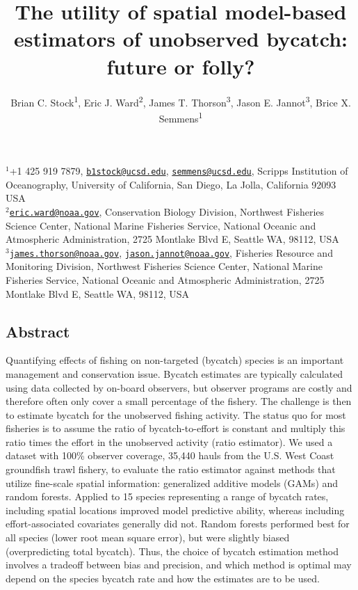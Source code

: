 \documentclass[]{article}
\title{The utility of spatial model-based estimators of unobserved bycatch:
future or folly?}
\author{Brian C. Stock\textsuperscript{1}, Eric J. Ward\textsuperscript{2},
James T. Thorson\textsuperscript{3}, Jason E. Jannot\textsuperscript{3},
Brice X. Semmens\textsuperscript{1}}
\date{}
\begin{document}
\maketitle

\(^1\)+1 425 919 7879,
\href{mailto:b1stock@ucsd.edu}{\nolinkurl{b1stock@ucsd.edu}},
\href{mailto:semmens@ucsd.edu}{\nolinkurl{semmens@ucsd.edu}}, Scripps
Institution of Oceanography, University of California, San Diego, La
Jolla, California 92093 USA\\
\(^2\)\href{mailto:eric.ward@noaa.gov}{\nolinkurl{eric.ward@noaa.gov}},
Conservation Biology Division, Northwest Fisheries Science Center,
National Marine Fisheries Service, National Oceanic and Atmospheric
Administration, 2725 Montlake Blvd E, Seattle WA, 98112, USA\\
\(^3\)\href{mailto:james.thorson@noaa.gov}{\nolinkurl{james.thorson@noaa.gov}},
\href{mailto:jason.jannot@noaa.gov}{\nolinkurl{jason.jannot@noaa.gov}},
Fisheries Resource and Monitoring Division, Northwest Fisheries Science
Center, National Marine Fisheries Service, National Oceanic and
Atmospheric Administration, 2725 Montlake Blvd E, Seattle WA, 98112,
USA\\

\hypertarget{abstract}{%
\subsection{Abstract}\label{abstract}}

Quantifying effects of fishing on non-targeted (bycatch) species is an
important management and conservation issue. Bycatch estimates are
typically calculated using data collected by on-board observers, but
observer programs are costly and therefore often only cover a small
percentage of the fishery. The challenge is then to estimate bycatch for
the unobserved fishing activity. The status quo for most fisheries is to
assume the ratio of bycatch-to-effort is constant and multiply this
ratio times the effort in the unobserved activity (ratio estimator). We
used a dataset with 100\% observer coverage, 35,440 hauls from the U.S.
West Coast groundfish trawl fishery, to evaluate the ratio estimator
against methods that utilize fine-scale spatial information: generalized
additive models (GAMs) and random forests. Applied to 15 species
representing a range of bycatch rates, including spatial locations
improved model predictive ability, whereas including effort-associated
covariates generally did not. Random forests performed best for all
species (lower root mean square error), but were slightly biased
(overpredicting total bycatch). Thus, the choice of bycatch estimation
method involves a tradeoff between bias and precision, and which method
is optimal may depend on the species bycatch rate and how the estimates
are to be used.
\end{document}
